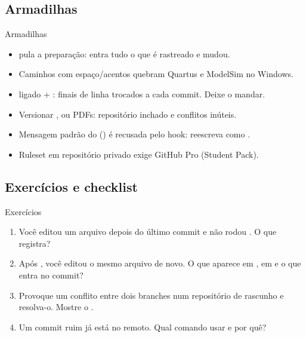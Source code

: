 \subsection[Armadilhas]{Armadilhas}
\begin{frame}{Armadilhas}
  \begin{armadilha}
    \begin{itemize}
      \small
      \item {} pula a preparação: entra tudo o que é
        rastreado e mudou.
      \item Caminhos com espaço/acentos quebram Quartus e ModelSim no Windows.
      \item {} ligado + : finais de linha
        trocados a cada commit. Deixe o  mandar.
      \item Versionar ,  ou PDFs: repositório inchado e
        conflitos inúteis.
      \item Mensagem padrão do  () é recusada
        pelo hook: reescreva como .
      \item Ruleset em repositório privado exige GitHub Pro (Student Pack).
    \end{itemize}
  \end{armadilha}
\end{frame}

\subsection[Exercícios]{Exercícios e checklist}
\begin{frame}{Exercícios}
  \begin{enumerate}
    \small
    \item Você editou um arquivo depois do último commit e não rodou
      . O que  registra?
    \item Após , você editou o mesmo arquivo de novo. O que aparece
      em , em  e o que entra no commit?
    \item Provoque um conflito entre dois branches num repositório de rascunho
      e resolva-o. Mostre o .
    \item Um commit ruim já está no  remoto. Qual comando usar e por quê?
  \end{enumerate}
\end{frame}

